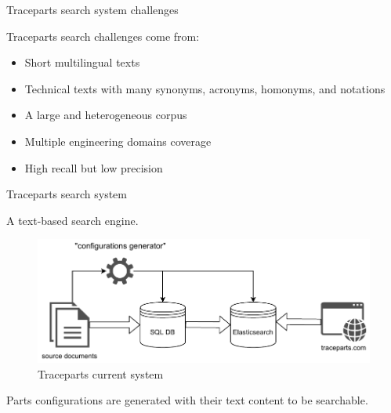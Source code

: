 \begin{frame}{Traceparts search system challenges}
    
    Traceparts search challenges come from:
    \begin{itemize}
        \item Short multilingual texts
        \item Technical texts with many synonyms, acronyms, homonyms, and notations
        \item A large and heterogeneous corpus
        \item Multiple engineering domains coverage
        \item High recall but low precision
    \end{itemize}

\end{frame}

\begin{frame}{Traceparts search system}
    
    \begin{center}
        A text-based search engine.
    \end{center}
    
    \begin{figure} [H]
        \begin{center}
            \includegraphics[scale=0.7]{images/tp_system.pdf} 
            \caption{Traceparts current system} 
        \end{center}
    \end{figure}

    \begin{center}
        Parts configurations are generated with their text content to be searchable.    
    \end{center}
    
\end{frame}